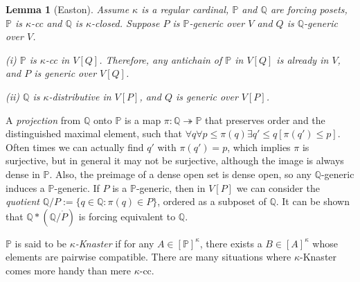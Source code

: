 \documentclass[10pt,reqno]{amsart}
\theoremstyle{plain}
\newtheorem{lemma}[theorem]{Lemma}
\theoremstyle{definition}
\theoremstyle{remark}
\begin{document}

\begin{lemma}[Easton]\label{forcing_Easton}
Assume $\kappa$ is a regular cardinal, $\mathbb{P}$ and $\mathbb{Q}$ are forcing posets, $\mathbb{P}$ is $\kappa$-cc and $\mathbb{Q}$ is $\kappa$-closed. Suppose $P$ is $\mathbb{P}$-generic over $V$ and $Q$ is $\mathbb{Q}$-generic over $V$.

(i) $\mathbb{P}$ is $\kappa$-cc in $V[Q]$. Therefore, any antichain of $\mathbb{P}$ in $V[Q]$ is already in $V$, and $P$ is generic over $V[Q]$.

(ii) $\mathbb{Q}$ is $\kappa$-distributive in $V[P]$, and $Q$ is generic over $V[P]$.
\end{lemma}



A \textit{projection} from $\mathbb{Q}$ onto $\mathbb{P}$ is a map $\pi:\mathbb{Q}\twoheadrightarrow\mathbb{P}$ that preserves order and the distinguished maximal element, such that $\forall q\forall p\leq\pi(q)\exists q'\leq q[\pi(q')\leq p]$. Often times we can actually find $q'$ with $\pi(q')=p$, which implies $\pi$ is surjective, but in general it may not be surjective, although the image is always dense in $\mathbb{P}$. Also, the preimage of a dense open set is dense open, so any $\mathbb{Q}$-generic induces a $\mathbb{P}$-generic. If $P$ is a $\mathbb{P}$-generic, then in $V[P]$ we can consider the \textit{quotient} $\mathbb{Q}/P:=\{q\in\mathbb{Q}:\pi(q)\in P\}$, ordered as a subposet of $\mathbb{Q}$. It can be shown that $\mathbb{Q}*(\mathbb{Q}/\dot{P})$ is forcing equivalent to $\mathbb{Q}$.


$\mathbb{P}$ is said to be \textit{$\kappa$-Knaster} if for any $A\in[\mathbb{P}]^\kappa$, there exists a $B\in [A]^\kappa$ whose elements are pairwise compatible. There are many situations where $\kappa$-Knaster comes more handy than mere $\kappa$-cc.
\end{document}
